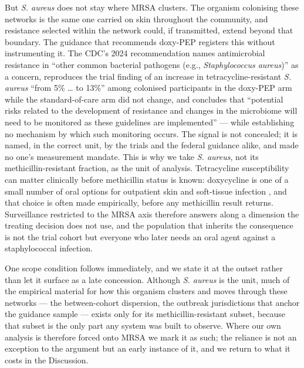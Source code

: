 \documentclass[10pt,letterpaper]{article}
\begin{document}
But \emph{S. aureus} does not stay where MRSA clusters. The organism
colonising these networks is the same one carried on skin throughout the
community, and resistance selected within the network could, if transmitted, extend beyond that boundary. The guidance that recommends doxy-PEP registers this
without instrumenting it. The CDC's 2024 recommendation names
antimicrobial resistance in ``other common bacterial pathogens (e.g.,
\emph{Staphylococcus aureus})'' as a concern, reproduces the trial
finding of an increase in tetracycline-resistant \emph{S. aureus} ``from
5\% \ldots{} to 13\%'' among colonised participants in the doxy-PEP arm
while the standard-of-care arm did not change, and concludes that
``potential risks related to the development of resistance and changes
in the microbiome will need to be monitored as these guidelines are
implemented'' \cite{cdc2024doxypep} --- while establishing no mechanism
by which such monitoring occurs. The signal is not concealed; it is
named, in the correct unit, by the trials and the federal guidance
alike, and made no one's measurement mandate. This is why we take
\emph{S. aureus}, not its methicillin-resistant fraction, as the unit of
analysis. Tetracycline susceptibility can matter clinically before
methicillin status is known: doxycycline is one of a small number of
oral options for outpatient skin and soft-tissue infection
\cite{stevens2014, liu2011}, and that choice is often made empirically,
before any methicillin result returns. Surveillance restricted to the
MRSA axis therefore answers along a dimension the treating decision does
not use, and the population that inherits the consequence is not the
trial cohort but everyone who later needs an oral agent against a
staphylococcal infection.

One scope condition follows immediately, and we state it at the outset
rather than let it surface as a late concession. Although \emph{S.
aureus} is the unit, much of the empirical material for how this
organism clusters and moves through these networks --- the
between-cohort dispersion, the outbreak jurisdictions that anchor the
guidance sample --- exists only for its methicillin-resistant subset,
because that subset is the only part any system was built to observe.
Where our own analysis is therefore forced onto MRSA we mark it as such;
the reliance is not an exception to the argument but an early instance
of it, and we return to what it costs in the Discussion.
\end{document}
